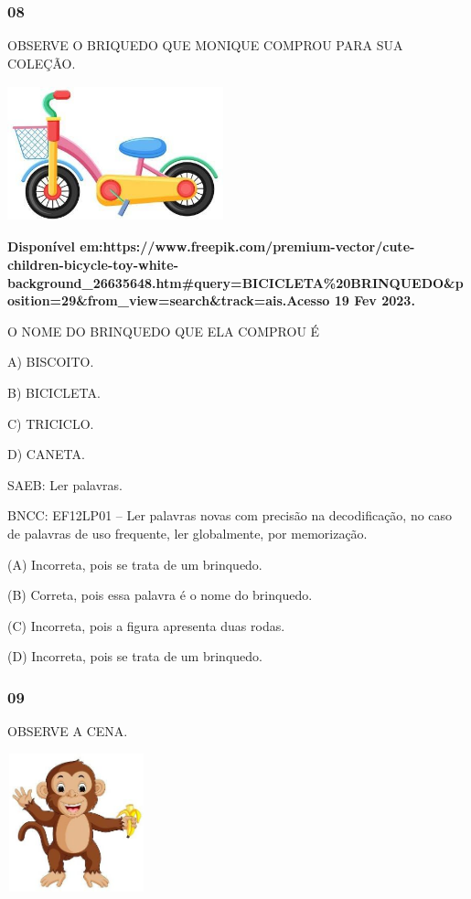 \subsubsection{08}\label{section-48}

OBSERVE O BRIQUEDO QUE MONIQUE COMPROU PARA SUA COLEÇÃO.

\includegraphics[width=2.45625in,height=1.54583in]{media/image217.jpg}

\textbf{Disponível
em:https://www.freepik.com/premium-vector/cute-children-bicycle-toy-white-background\_26635648.htm\#query=BICICLETA\%20BRINQUEDO\&position=29\&from\_view=search\&track=ais.Acesso
19 Fev 2023.}

O NOME DO BRINQUEDO QUE ELA COMPROU É

A) BISCOITO.

B) BICICLETA.

C) TRICICLO.

D) CANETA.

SAEB: Ler palavras.

BNCC: EF12LP01 -- Ler palavras novas com precisão na
decodificação, no caso de palavras de uso frequente, ler globalmente,
por memorização.

\protect\hypertarget{_heading=h.3tbugp1}{}{}(A) Incorreta, pois se trata de um brinquedo.

(B) Correta, pois essa palavra é o nome do brinquedo.

(C) Incorreta, pois a figura apresenta duas rodas.

(D) Incorreta, pois se trata de um brinquedo.

\subsubsection{09}\label{section-49}

OBSERVE A CENA.

\includegraphics[width=1.57569in,height=1.57569in]{media/image218.jpg}

